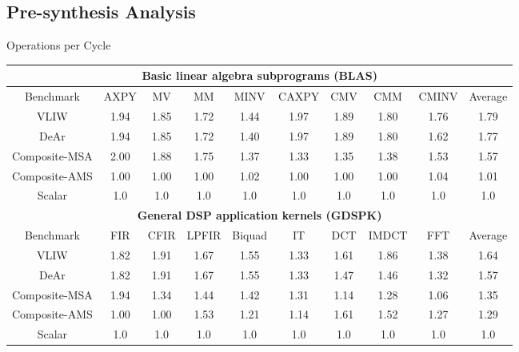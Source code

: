 \documentclass{beamer}
\begin{document}
\begin{CJK}{UTF8}{bkai}
    \subsection{Pre-synthesis Analysis}

    \begin{frame}{Operations per Cycle}
        \begin{table}[!ht]
            \centering
            \resizebox{\columnwidth}{!}
            {
                \begin{tabular}{|c|c|c|c|c|c|c|c|c|c|}
                    \hline
                    \multicolumn{10}{|c|}{\textbf{Basic linear algebra subprograms (BLAS)}} \\ \hline
                    Benchmark  &  AXPY  &  MV  &  MM  &  MINV  &  CAXPY  &  CMV  &  CMM  &  CMINV  &  Average \\ \hline 
                    VLIW  &   1.94  &   1.85  &   1.72  &   1.44  &   1.97  &   1.89  &   1.80  &   1.76  &   1.79     \\ \hline 
                    DeAr  &   1.94  &   1.85  &   1.72  &   1.40  &   1.97  &   1.89  &   1.80  &   1.62  &   1.77     \\ \hline
                    Composite-MSA  &   2.00  &   1.88  &   1.75  &   1.37  &   1.33  &   1.35  &   1.38  &   1.53  &   1.57     \\ \hline 
                    Composite-AMS  &   1.00  &   1.00  &   1.00  &   1.02  &   1.00  &   1.00  &   1.00  &   1.04  &   1.01     \\ \hline 
                    Scalar  & 1.0  & 1.0  & 1.0  & 1.0  & 1.0  & 1.0  & 1.0  & 1.0  & 1.0 \\ \hline 
                    \multicolumn{10}{|c|}{\textbf{General DSP application kernels (GDSPK)}}                     \\ \hline
                    Benchmark  &  FIR  &  CFIR  &  LPFIR  &  Biquad  &  IT  &  DCT  &  IMDCT  &  FFT  &  Average \\ \hline 
                    VLIW  &   1.82  &   1.91  &   1.67  &   1.55  &   1.33  &   1.61  &   1.86  &   1.38  &   1.64     \\ \hline 
                    DeAr  &   1.82  &   1.91  &   1.67  &   1.55  &   1.33  &   1.47  &   1.46  &   1.32  &   1.57     \\ \hline 
                    Composite-MSA  &   1.94  &   1.34  &   1.44  &   1.42  &   1.31  &   1.14  &   1.28  &   1.06  &   1.35     \\ \hline 
                    Composite-AMS  &   1.00  &   1.00  &   1.53  &   1.21  &   1.14  &   1.61  &   1.52  &   1.27  &   1.29     \\ \hline 
                    Scalar  & 1.0  & 1.0  & 1.0  & 1.0  & 1.0  & 1.0  & 1.0  & 1.0  & 1.0 \\ \hline 
                \end{tabular}
            }
        \end{table}


\end{frame}
\end{CJK}
\end{document}
